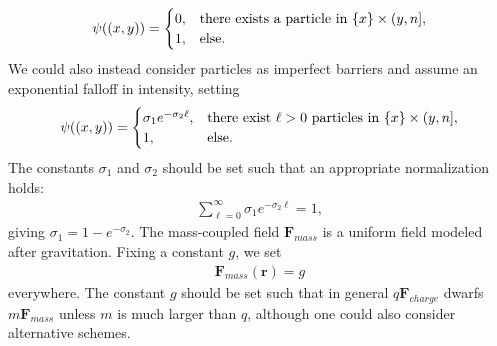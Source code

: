 \documentclass[12pt,letterpaper]{article}
\newcommand{\mb}{\mathbf}
\begin{document}
\begin{itemize}
\begin{align*}
\psi((x, y)) = \begin{cases}
0, &\textnormal{there exists a particle in } \{x\} \times (y, n], \\
1, &\textnormal{else}.
\end{cases}
\end{align*}
We could also instead consider particles as imperfect barriers and assume an exponential falloff in intensity, setting
\begin{align*}
\psi((x, y)) = \begin{cases}
\sigma_{1}e^{-\sigma_{2}\ell}, &\textnormal{there exist } \ell > 0 \textnormal{ particles in } \{x\} \times (y, n], \\
1, &\textnormal{else}.
\end{cases}
\end{align*}
The constants $\sigma_{1}$ and $\sigma_{2}$ should be set such that an appropriate normalization holds:
\begin{align*}
\sum_{\ell = 0}^{\infty} \sigma_{1}e^{-\sigma_{2}\ell} = 1,
\end{align*}
giving $\sigma_{1} = 1 - e^{-\sigma_{2}}$. The mass-coupled field $\mb{F}_{mass}$ is a uniform field modeled after gravitation. Fixing a constant $g$, we set
\begin{align*}
\mb{F}_{mass}(\mb{r}) = g
\end{align*}
everywhere. The constant $g$ should be set such that in general $q\mb{F}_{charge}$ dwarfs $m\mb{F}_{mass}$ unless $m$ is much larger than $q$, although one could also consider alternative schemes.

\end{itemize}
\end{document}
